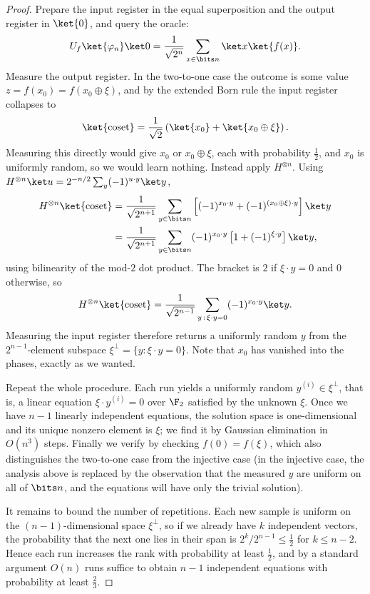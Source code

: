 \begin{proof}
	Prepare the input register in the equal superposition and the output register in $\ket{0}$, and query the oracle:
	$$U_f\ket{\varphi_n}\ket0 = \frac1{\sqrt{2^n}}\sum_{x\in\bits n}\ket x\ket{f(x)}.$$
	Measure the output register. In the two-to-one case the outcome is some value $z = f(x_0) = f(x_0\oplus\xi)$, and by the extended Born rule the input register collapses to
	$$\ket{\text{coset}} = \frac{1}{\sqrt2}\left(\ket{x_0}+\ket{x_0\oplus\xi}\right).$$
	Measuring this directly would give $x_0$ or $x_0\oplus\xi$, each with probability $\tfrac12$, and $x_0$ is uniformly random, so we would learn nothing. Instead apply $H^{\otimes n}$. Using $H^{\otimes n}\ket u = 2^{-n/2}\sum_y(-1)^{u\cdot y}\ket y$,
	\begin{align*}
		H^{\otimes n}\ket{\text{coset}} &= \frac1{\sqrt{2^{n+1}}}\sum_{y\in\bits n}\left[(-1)^{x_0\cdot y} + (-1)^{(x_0\oplus\xi)\cdot y}\right]\ket y\\
		&= \frac{1}{\sqrt{2^{n+1}}}\sum_{y\in\bits n}(-1)^{x_0\cdot y}\left[1+(-1)^{\xi\cdot y}\right]\ket y,
	\end{align*}
	using bilinearity of the mod-$2$ dot product. The bracket is $2$ if $\xi\cdot y = 0$ and $0$ otherwise, so
	$$H^{\otimes n}\ket{\text{coset}} = \frac{1}{\sqrt{2^{n-1}}}\sum_{y\,:\,\xi\cdot y = 0}(-1)^{x_0\cdot y}\ket y.$$
	Measuring the input register therefore returns a uniformly random $y$ from the $2^{n-1}$-element subspace $\xi^\perp = \{y : \xi\cdot y = 0\}$. Note that $x_0$ has vanished into the phases, exactly as we wanted.

	Repeat the whole procedure. Each run yields a uniformly random $y^{(i)}\in\xi^\perp$, that is, a linear equation $\xi\cdot y^{(i)} = 0$ over $\F_2$ satisfied by the unknown $\xi$. Once we have $n-1$ linearly independent equations, the solution space is one-dimensional and its unique nonzero element is $\xi$; we find it by Gaussian elimination in $O(n^3)$ steps. Finally we verify by checking $f(0) = f(\xi)$, which also distinguishes the two-to-one case from the injective case (in the injective case, the analysis above is replaced by the observation that the measured $y$ are uniform on all of $\bits n$, and the equations will have only the trivial solution).

	It remains to bound the number of repetitions. Each new sample is uniform on the $(n-1)$-dimensional space $\xi^\perp$, so if we already have $k$ independent vectors, the probability that the next one lies in their span is $2^{k}/2^{n-1}\leq\tfrac12$ for $k \le n-2$. Hence each run increases the rank with probability at least $\tfrac12$, and by a standard argument $O(n)$ runs suffice to obtain $n-1$ independent equations with probability at least $\tfrac23$.
\end{proof}

